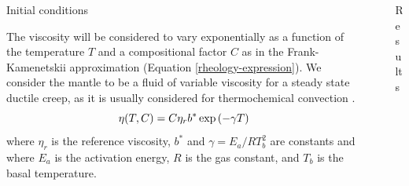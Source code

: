 \documentclass[final]{beamer}
\newlength{\sepwidth}
\newlength{\colwidth}
\newcommand{\separatorcolumn}{\begin{column}{\sepwidth}\end{column}}
\begin{document}
\begin{frame}[t]
\begin{columns}[t]
\begin{column}{\colwidth}
\begin{block}{Initial conditions}


    \heading{\textcolor{darkblue}{Rheology model}}
    
      The viscosity will be considered to vary exponentially as a function of the temperature $T$ and a compositional factor $C$ as in the Frank-Kamenetskii approximation (Equation \ref{rheology-expression}). We consider the mantle to be a fluid of variable viscosity for a steady state ductile creep, as it is usually considered for thermochemical convection \cite{solomatov2000scaling}.
      \begin{equation}{\label{rheology-expression}}
       \eta(T,C) = C\eta_r b^* \exp{(-\gamma T)}
      \end{equation}
      \noindent where $\eta_r$ is the reference viscosity, $b^*$ and $\gamma=E_{a}/RT_{b}^{2}$ are constants and where $E_a$ is the activation energy, $R$ is the gas constant, and $T_b$ is the basal temperature.
        
  \end{block}
\end{column}


\separatorcolumn

\begin{column}{\colwidth}

  \begin{block}{Results}


\end{block}
\end{column}
\end{columns}
\end{frame}
\end{document}
